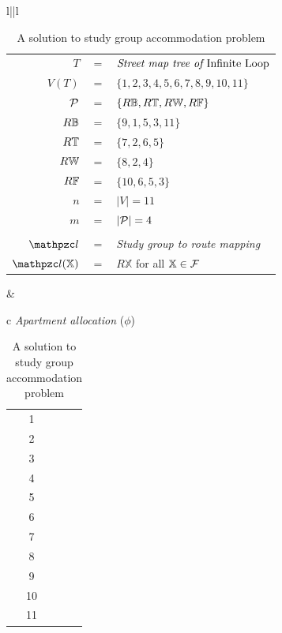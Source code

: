 \documentclass[MS]             %
              {iitmdiss_as}    %
\begin{document}
\begin{table}[htbp]
  \centering
  {\footnotesize    
    \begin{tabular}{l||l}
      \begin{tabular}{rcl}
        $T $&$=$&$ \text{\em Street map tree of {\em Infinite Loop}}$\\
        $V(T) $&$=$&$ \{ 1, 2, 3, 4, 5, 6, 7, 8, 9, 10, 11 \}$\\
        ${\cal P} $&$=$&$ \{R\mathbb{B}, R\mathbb{T}, R\mathbb{W}, R\mathbb{F}\}$\\
        $R\mathbb{B} $&$=$&$ \{9, 1, 5, 3, 11\}$\\
        $R\mathbb{T} $&$=$&$ \{7, 2, 6, 5\}$\\
        $R\mathbb{W} $&$=$&$ \{8, 2, 4 \}$\\
        $R\mathbb{F} $&$=$&$ \{10, 6, 5, 3\}$\\
        $n $&$=$&$ |V| = 11$\\
        $m $&$=$&$ |{\cal P}| = 4$\\\\
        $\cl $&$=$& {\em Study group to route mapping}\\        
        $\cl(\mathbb{X}) $&$=$&  $R\mathbb{X}$ for all $\mathbb{X} \in
        {\cal F}$
      \end{tabular} & 
      \begin{tabular}{c}
       {\em Apartment allocation }($\phi$)\\
                    \begin{tabular}{c|c}                      
                      1  & \xSa\\
                      2  & \xPi\\
                      3  & \xFr\\
                      4  & \xWo\\
                      5  & \xCh\\
                      6  & \xVi\\
                      7  & \xPa\\
                      8  & \xSn\\
                      9  & \xLu\\
                      10 & \xLi\\
                      11 & \xSc                     
                    \end{tabular}
      \end{tabular}\\
    \end{tabular}
  }
  \caption{\figtabsize A solution to study group accommodation problem}
  \label{tab:iltree}
\end{table}
\end{document}

